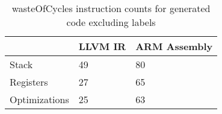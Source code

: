 \begin{table}[h!]
\centering
\begin{tabular}{p{}p{}p{}}
  \hline
 & LLVM IR & ARM Assembly \\ 
  \hline
Stack &  49 &  80 \\ 
  Registers &  27 &  65 \\ 
  Optimizations &  25 &  63 \\ 
   \hline
\end{tabular}
\caption{wasteOfCycles instruction counts for generated code excluding labels}
\end{table}
